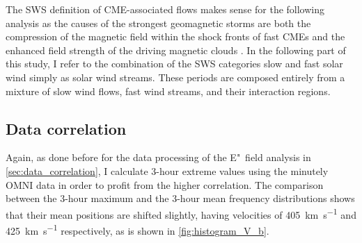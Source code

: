 The SWS definition of CME-associated flows makes sense for the following analysis as the causes of the strongest geomagnetic storms are both the compression of the magnetic field within the shock fronts of fast CMEs and the enhanced field strength of the driving magnetic clouds \citep{Bothmer1995}. In the following part of this study, I refer to the combination of the SWS categories slow and fast solar wind simply as solar wind streams. These periods are composed entirely from a mixture of slow wind flows, fast wind streams, and their interaction regions.


\subsection{Data correlation}
Again, as done before for the data processing of the E"~field analysis in \autoref{sec:data_correlation}, I calculate 3-hour extreme values using the minutely OMNI data in order to profit from the higher correlation. The comparison between the 3-hour maximum and the 3-hour mean frequency distributions shows that their mean positions are shifted slightly, having velocities of \SI{405}{\km\per\s} and \SI{425}{\km\per\s} respectively, as is shown in \autoref{fig:histogram_V_b}.
